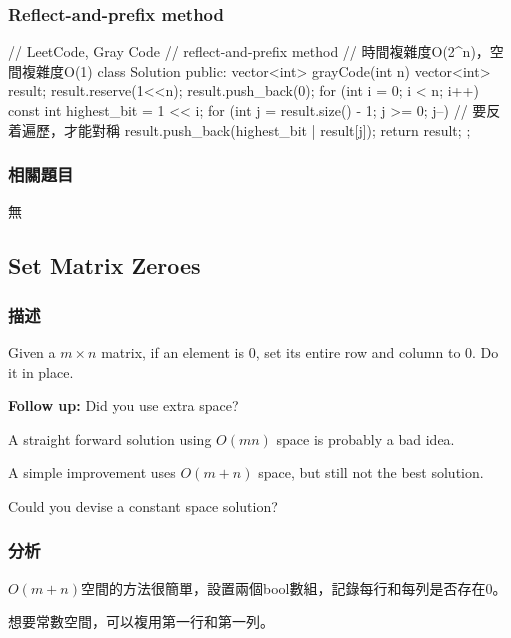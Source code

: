 \subsubsection{Reflect-and-prefix method}
\begin{Code}
// LeetCode, Gray Code
// reflect-and-prefix method
// 時間複雜度O(2^n)，空間複雜度O(1)
class Solution {
public:
    vector<int> grayCode(int n) {
        vector<int> result;
        result.reserve(1<<n);
        result.push_back(0);
        for (int i = 0; i < n; i++) {
            const int highest_bit = 1 << i;
            for (int j = result.size() - 1; j >= 0; j--) // 要反着遍歷，才能對稱
                result.push_back(highest_bit | result[j]);
        }
        return result;
    }
};
\end{Code}


\subsubsection{相關題目}
\begindot
\item 無
\myenddot


\subsection{Set Matrix Zeroes} %
\label{sec:set-matrix-zeroes}


\subsubsection{描述}
Given a $m \times n$ matrix, if an element is 0, set its entire row and column to 0. Do it in place.

\textbf{Follow up:}
Did you use extra space?

A straight forward solution using $O(mn)$ space is probably a bad idea.

A simple improvement uses $O(m + n)$ space, but still not the best solution.

Could you devise a constant space solution?


\subsubsection{分析}
$O(m+n)$空間的方法很簡單，設置兩個bool數組，記錄每行和每列是否存在0。

想要常數空間，可以複用第一行和第一列。


